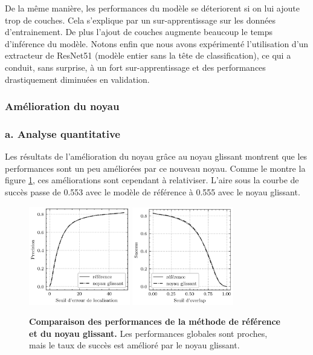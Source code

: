 \documentclass[10pt,twocolumn,letterpaper,french]{article}
\begin{document}
De la même manière, les performances du modèle se déteriorent si on lui ajoute trop de couches. Cela s'explique par un sur-apprentissage sur les données d'entrainement. De plus l'ajout de couches augmente beaucoup le temps d'inférence du modèle. Notons enfin que nous avons expérimenté l'utilisation d'un extracteur de ResNet51 \cite{he2015deep} (modèle entier sans la tête de classification), ce qui a conduit, sans surprise, à un fort sur-apprentissage et des performances drastiquement diminuées en validation. 




\subsubsection*{Amélioration du noyau}

\subsubsection*{a. Analyse quantitative}

Les résultats de l'amélioration du noyau grâce au noyau glissant montrent que les performances sont un peu améliorées par ce nouveau noyau. Comme le montre la figure \ref{courbes_prec2}, ces améliorations sont cependant à relativiser. L'aire sous la courbe de succès passe de 0.553 avec le modèle de référence à 0.555 avec le noyau glissant.

\begin{figure}[!h]
  \centering
  \includegraphics[width=125pt]{images/gamma/courbes_pre.png} 
  \includegraphics[width=125pt]{images/gamma/courbes_succ.png} 
  \caption{\textbf{Comparaison des performances de la méthode de référence et du noyau glissant.} Les performances globales sont proches, mais le taux de succès est amélioré par le noyau glissant.}
  \label{courbes_prec2}
  \end{figure}
  
\end{document}
